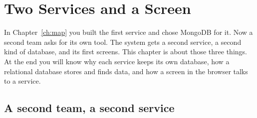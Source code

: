 \chapter{Two Services and a Screen}
\label{ch:two-services}


In Chapter~\ref{ch:map} you built the first service and chose MongoDB for it.
Now a second team asks for its own tool. The system gets a second service, a
second kind of database, and its first screens. This chapter is about those
three things. At the end you will know why each service keeps its own
database, how a relational database stores and finds data, and how a screen
in the browser talks to a service.

\section{A second team, a second service}

